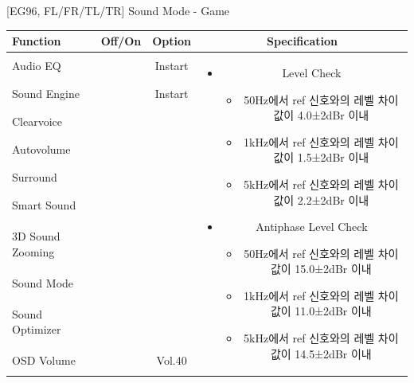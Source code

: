 \documentclass{beamer}
\begin{document}
\begin{frame}[t]{[EG96, FL/FR/TL/TR] Sound Mode - Game}
\begin{tiny}
\begin{tabular}{@{}lccc@{}}
\toprule
Function & Off/On & Option & Specification \\
\midrule
Audio EQ & \color{black}{Off} & Instart &
\multirow{10}{60mm}{
\begin{itemize}
\item Level Check
  \begin{itemize}
  \item 50Hz에서 ref 신호와의 레벨 차이값이 4.0±2dBr 이내
  \item 1kHz에서 ref 신호와의 레벨 차이값이 1.5±2dBr 이내
  \item 5kHz에서 ref 신호와의 레벨 차이값이 2.2±2dBr 이내
  \end{itemize}
\item Antiphase Level Check
  \begin{itemize}
  \item 50Hz에서 ref 신호와의 레벨 차이값이 15.0±2dBr 이내
  \item 1kHz에서 ref 신호와의 레벨 차이값이 11.0±2dBr 이내
  \item 5kHz에서 ref 신호와의 레벨 차이값이 14.5±2dBr 이내
  \end{itemize}
\end{itemize}
} \\
Sound Engine & \color{blue}{On} & Instart & \\
Clearvoice & \color{black}{Off} & & \\
Autovolume & \color{black}{Off} & & \\
Surround & \color{black}{Off} & & \\
Smart Sound & \color{black}{Off} & & \\
3D Sound Zooming & \color{black}{Off} & & \\
Sound Mode & \color{blue}{On} & \color{blue}{Game} & \\
Sound Optimizer & \color{black}{Off} & & \\
OSD Volume & \color{blue}{On} & Vol.40 & \\
\midrule
\end{tabular}
\end{tiny}

\end{frame}
\end{document}
